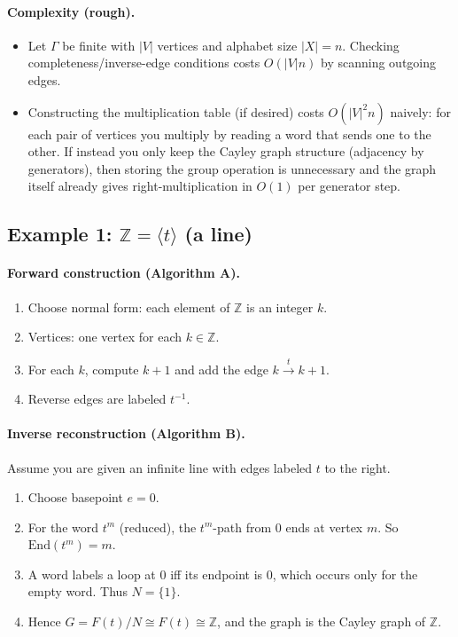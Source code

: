 \documentclass[11pt]{article}
\theoremstyle{definition}
\theoremstyle{plain}
\theoremstyle{remark}
\newcommand{\End}{\mathrm{End}}
\begin{document}
\paragraph{Complexity (rough).}\cite{cormen2009}
\begin{itemize}[leftmargin=2em]
\item Let $\Gamma$ be finite with $|V|$ vertices and alphabet size $|X|=n$. Checking completeness/inverse-edge conditions costs $O(|V|n)$ by scanning outgoing edges.
\item Constructing the multiplication table (if desired) costs $O(|V|^2 n)$ naively: for each pair of vertices you multiply by reading a word that sends one to the other. If instead you only keep the Cayley graph structure (adjacency by generators), then storing the group operation is unnecessary and the graph itself already gives right-multiplication in $O(1)$ per generator step.
\end{itemize}

\subsection*{Example 1: $\mathbb Z=\langle t\rangle$ (a line)}
\paragraph{Forward construction (Algorithm A).}
\begin{enumerate}[leftmargin=2.2em]
\item Choose normal form: each element of $\mathbb Z$ is an integer $k$.
\item Vertices: one vertex for each $k\in\mathbb Z$.
\item For each $k$, compute $k+1$ and add the edge $k\xrightarrow{t}k+1$.
\item Reverse edges are labeled $t^{-1}$.
\end{enumerate}

\paragraph{Inverse reconstruction (Algorithm B).}
Assume you are given an infinite line with edges labeled $t$ to the right.
\begin{enumerate}[leftmargin=2.2em]
\item Choose basepoint $e=0$.
\item For the word $t^m$ (reduced), the $t^m$-path from $0$ ends at vertex $m$.
So $\End(t^m)=m$.
\item A word labels a loop at $0$ iff its endpoint is $0$, which occurs only for the empty word.
Thus $N=\{1\}$.
\item Hence $G=F(t)/N\cong F(t)\cong \mathbb Z$, and the graph is the Cayley graph of $\mathbb Z$.
\end{enumerate}
\end{document}
